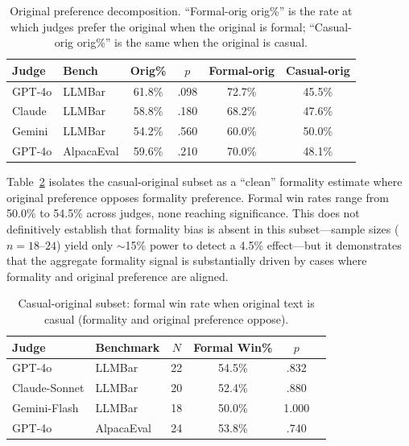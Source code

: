 \documentclass[11pt,a4paper]{article}
\begin{document}
\begin{table}[t]
\centering
\small
\caption{Original preference decomposition. ``Formal-orig orig\%'' is the rate at which judges prefer the original when the original is formal; ``Casual-orig orig\%'' is the same when the original is casual.}
\label{tab:orig_decomp}
\begin{tabular}{llcccc}
\toprule
\textbf{Judge} & \textbf{Bench} & \textbf{Orig\%} & \textbf{$p$} & \textbf{Formal-orig} & \textbf{Casual-orig} \\
\midrule
GPT-4o & LLMBar & 61.8\% & .098 & 72.7\% & 45.5\% \\
Claude & LLMBar & 58.8\% & .180 & 68.2\% & 47.6\% \\
Gemini & LLMBar & 54.2\% & .560 & 60.0\% & 50.0\% \\
GPT-4o & AlpacaEval & 59.6\% & .210 & 70.0\% & 48.1\% \\
\bottomrule
\end{tabular}
\end{table}

Table~\ref{tab:casual_orig} isolates the casual-original subset as a ``clean'' formality estimate where original preference opposes formality preference.
Formal win rates range from 50.0\% to 54.5\% across judges, none reaching significance.
This does not definitively establish that formality bias is absent in this subset---sample sizes ($n=18$--$24$) yield only $\sim$15\% power to detect a 4.5\% effect---but it demonstrates that the aggregate formality signal is substantially driven by cases where formality and original preference are aligned.

\begin{table}[t]
\centering
\small
\caption{Casual-original subset: formal win rate when original text is casual (formality and original preference oppose).}
\label{tab:casual_orig}
\begin{tabular}{llcccc}
\toprule
\textbf{Judge} & \textbf{Benchmark} & \textbf{$N$} & \textbf{Formal Win\%} & \textbf{$p$} \\
\midrule
GPT-4o & LLMBar & 22 & 54.5\% & .832 \\
Claude-Sonnet & LLMBar & 20 & 52.4\% & .880 \\
Gemini-Flash & LLMBar & 18 & 50.0\% & 1.000 \\
GPT-4o & AlpacaEval & 24 & 53.8\% & .740 \\
\bottomrule
\end{tabular}
\end{table}
\end{document}

